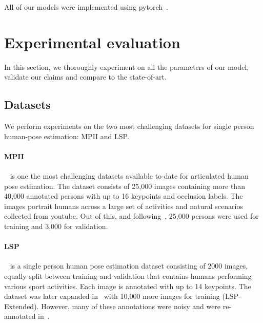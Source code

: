 \documentclass[a4paper, 10pt, conference]{ieeeconf}      \usepackage{FG2020}
\begin{document}
All of our models were implemented using pytorch~\cite{paszke2017automatic}.








 \section{Experimental evaluation}\label{sec:evaluation}
In this section, we thoroughly experiment on all the parameters of our model, validate our claims and compare to the state-of-art.

\subsection{Datasets}
We perform experiments on the two most challenging datasets for single person human-pose estimation: MPII and LSP. 

\paragraph{MPII}~\cite{andriluka14cvpr} is one the most challenging datasets available to-date for articulated human pose estimation. The dataset consists of 25,000 images containing more than 40,000 annotated persons with up to 16 keypoints and occlusion labels. The images portrait humans across a large set of activities and natural scenarios collected from youtube. Out of this, and following~\cite{tompson2015efficient}, 25,000 persons were used for training and 3,000 for validation.

\paragraph{LSP}~\cite{Johnson10} is a single person human pose estimation dataset consisting of 2000 images, equally split between training and validation that contains humans performing various sport activities. Each image is annotated with up to 14 keypoints. The dataset was later expanded in~\cite{Johnson11} with 10,000 more images for training (LSP-Extended). However, many of these annotations were noisy and were re-annotated in~\cite{pishchulin16cvpr}. 
\end{document}
